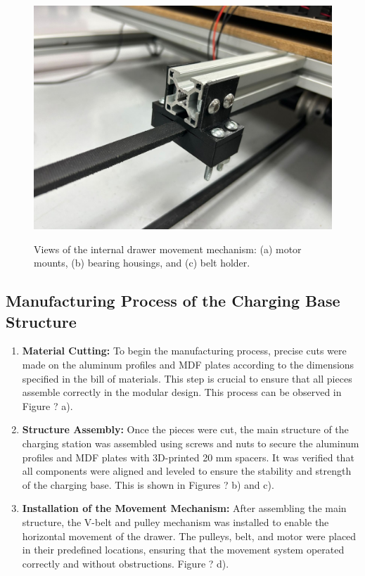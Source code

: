 \begin{figure}[H]
\begin{minipage}{0.32\textwidth}
        \centering
        \includegraphics[width=\textwidth]{MECANISMO/MECANISMO_AGARRE.jpg}
        \label{fig:mecanismo_agarre}
    \end{minipage}%
    \caption{Views of the internal drawer movement mechanism: (a) motor mounts, (b) bearing housings, and (c) belt holder.}
    \label{fig:mecanismo_views}
\end{figure}




\subsection{Manufacturing Process of the Charging Base Structure}

    \begin{enumerate}
        \item \textbf{Material Cutting:} To begin the manufacturing process, precise cuts were made on the aluminum profiles and MDF plates according to the dimensions specified in the bill of materials. This step is crucial to ensure that all pieces assemble correctly in the modular design. This process can be observed in Figure ? a).
            
        \item \textbf{Structure Assembly:} Once the pieces were cut, the main structure of the charging station was assembled using screws and nuts to secure the aluminum profiles and MDF plates with 3D-printed 20 mm spacers. It was verified that all components were aligned and leveled to ensure the stability and strength of the charging base. This is shown in Figures ? b) and c).
            
        \item \textbf{Installation of the Movement Mechanism:} After assembling the main structure, the V-belt and pulley mechanism was installed to enable the horizontal movement of the drawer. The pulleys, belt, and motor were placed in their predefined locations, ensuring that the movement system operated correctly and without obstructions. Figure ? d).
        
    \end{enumerate}


